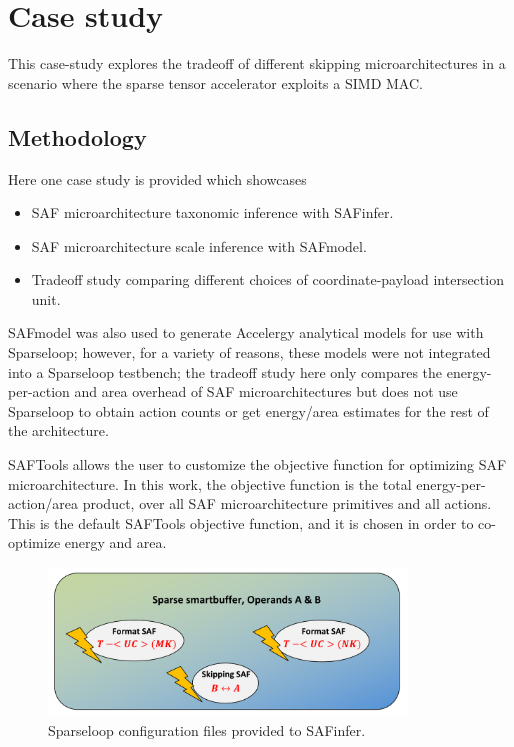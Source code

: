 \chapter{Case study}
\label{chapter:case_studies}

This case-study explores the tradeoff of different skipping microarchitectures in a scenario where the sparse tensor accelerator exploits a SIMD MAC.

\section{Methodology}

 Here one case study is provided which showcases

\begin{itemize}
    \item SAF microarchitecture taxonomic inference with SAFinfer.
    \item SAF microarchitecture scale inference with SAFmodel.
    \item Tradeoff study comparing different choices of coordinate-payload intersection unit.
\end{itemize}

SAFmodel was also used to generate Accelergy analytical models for use with Sparseloop; however, for a variety of reasons, these models were not integrated into a Sparseloop testbench; the tradeoff study here only compares the energy-per-action and area overhead of SAF microarchitectures but does not use Sparseloop to obtain action counts or get energy/area estimates for the rest of the architecture.

SAFTools allows the user to customize the objective function for optimizing SAF microarchitecture. In this work, the objective function is the total energy-per-action/area product, over all SAF microarchitecture primitives and all actions. This is the default SAFTools objective function, and it is chosen in order to co-optimize energy and area. 

\begin{figure}[ht]
\centering
\includegraphics[width=0.85\textwidth]{figures/case_study_declarative.pdf}
\caption{Sparseloop configuration files provided to SAFinfer.}
\label{fig:case_study_declarative}
\end{figure}

